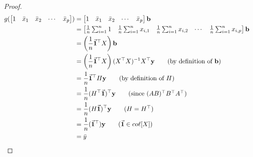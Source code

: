 \documentclass[12pt]{article}
\begin{document}
\begin{enumerate}




\begin{proof}
	\begin{align*}
		g(\begin{bmatrix}
			1 & \bar{x}_1 & \bar{x}_2 & \cdots & \bar{x}_p
		\end{bmatrix})
		&=\begin{bmatrix}
			1 & \bar{x}_1 & \bar{x}_2 & \cdots & \bar{x}_p
		\end{bmatrix}
		\mathbf{b}\\
		&=\begin{bmatrix}
			\frac{1}{n}\sum_{i=1}^{n}1 & \frac{1}{n}\sum_{i=1}^{n}x_{i,1}
			& \frac{1}{n}\sum_{i=1}^{n}x_{i,2}
			& \cdots
			& \frac{1}{n}\sum_{i=1}^{n}x_{i,p}
		\end{bmatrix}\mathbf{b}\\
		&=\left(\frac{1}{n}\vec{\mathbf{1}}^\top X\right)\mathbf{b}\\
		&=\left(\frac{1}{n}\vec{\mathbf{1}}^\top X\right)(X^\top X)^{-1}X^\top \mathbf{y}
		\tag{by definition of $\mathbf{b}$}\\
		&=\frac{1}{n}\vec{\mathbf{1}}^\top H\mathbf{y}
		\tag{by definition of $H$}\\
		&=\frac{1}{n}(H^\top \vec{\mathbf{1}})^\top\mathbf{y}
		\tag{since $(AB)^\top B^\top A^\top$}\\
		&=\frac{1}{n}(H\vec{\mathbf{1}})^\top \mathbf{y}
		\tag{$H=H^\top$}\\
		&=\frac{1}{n}(\vec{\mathbf{1}}^\top)\mathbf{y}
		\tag{$\vec{\mathbf{1}}\in co\ell [X]$}\\
		&=\bar{y}
	\end{align*}
\end{proof}



\end{enumerate}
\end{document}
